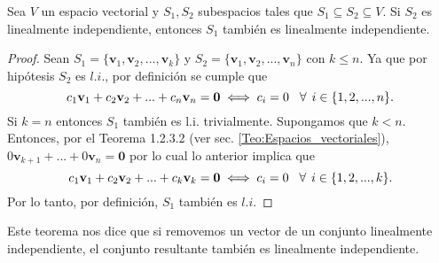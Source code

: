 \documentclass[12pt,dvipsnames]{article}
\newenvironment{teorema}[2][Teorema]{\begin{trivlist}
\item[\hskip \labelsep {\bfseries #1}\hskip \labelsep {\bfseries #2.}]}{\end{trivlist}}
\begin{document}
\begin{teorema} {3.3.3.2} 

    Sea $V$ un espacio vectorial y $S_1,S_2$ subespacios tales que $S_1\subseteq S_2\subseteq V$. Si $S_2$ es linealmente independiente, entonces $S_1$ también es linealmente independiente.

\begin{proof}

    Sean $S_1=\{\mathbf{v}_1,\mathbf{v}_2, ..., \mathbf{v}_k\}$ y $S_2=\{\mathbf{v}_1,\mathbf{v}_2, ..., \mathbf{v}_n\}$ con $k\leq n$. Ya que por hipótesis $S_2$ es $l.i.$, por definición se cumple que $$c_1\mathbf{v}_1+c_2\mathbf{v}_2+...+c_n\mathbf{v}_n=\mathbf{0}\iff c_i=0\hspace{3mm}\forall\hspace{1.5mm}  i\in\{1,2, ..., n\}.$$ Si $k=n$ entonces $S_1$ también es l.i. trivialmente. Supongamos que $k<n$. Entonces, por el Teorema 1.2.3.2 (ver sec. \ref{Teo:Espacios_vectoriales}), $0\mathbf{v}_{k+1}+...+0\mathbf{v}_n=\mathbf{0}$ por lo cual lo anterior implica que $$c_1\mathbf{v}_1+c_2\mathbf{v}_2+...+c_k\mathbf{v}_k=\mathbf{0}\iff c_i=0\hspace{3mm}\forall\hspace{1.5mm}  i\in\{1,2, ...,k\}.$$ Por lo tanto, por definición, $S_1$ también es $l.i$.

\end{proof}

Este teorema nos dice que si removemos un vector de un conjunto linealmente independiente, el conjunto resultante también es linealmente independiente.

\end{teorema}
\end{document}
